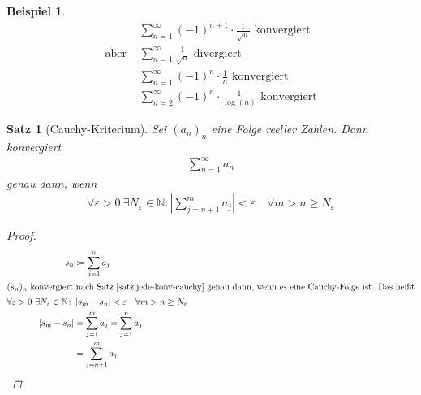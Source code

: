 \documentclass[11pt, twoside, a4paper]{article}
\theoremstyle{plain}
\newtheorem{satz}[blockelement]{Satz}
\newtheorem{beispiel}[blockelement]{Beispiel}
\newcommand{\pair}[1]{\left(#1\right)}
\newcommand{\abs}[1]{\left|#1\right|}
\newcommand{\definedas}[0]{\coloneqq}
\newcommand{\N}{\mathbb{N}}
\begin{document}
    \begin{beispiel}
        \begin{align*}
            &\sum_{n=1}^{\infty} \pair{-1}^{n+1} \cdot \frac{1}{\sqrt{n}}\text{ konvergiert}\\
            \text{aber } &\sum_{n=1}^{\infty} \frac{1}{\sqrt {n}} \text{ divergiert}\\
            &\sum_{n=1}^{\infty} (-1)^{n} \cdot \frac{1}{n}\text{ konvergiert}\\
            &\sum_{n=2}^{\infty} (-1)^n \cdot \frac{1}{\log\pair{n}}\text{ konvergiert}
        \end{align*}
    \end{beispiel}

    \begin{satz}[Cauchy-Kriterium] %
        \label{satz:cauchy-kriterium}
        Sei $(a_n)_n$ eine Folge reeller Zahlen. Dann konvergiert
        \begin{align*}
            \sum_{n=1}^{\infty} a_n
        \end{align*}
        genau dann, wenn
        \begin{align*}
            \forall \varepsilon > 0~\exists N_{\varepsilon}\in\N\colon \abs{\sum_{j=n+1}^{m} a_j} <\varepsilon\quad\forall m>n\geq N_{\varepsilon}
        \end{align*}
        \begin{proof}
            \begin{align*}
                s_n &\definedas \sum_{j=1}^{n} a_j\\
                \intertext{$(s_n)_n$ konvergiert nach Satz~\ref{satz:jede-konv-cauchy} genau dann, wenn es eine Cauchy-Folge ist. Das heißt}
                \forall\varepsilon > 0~\exists N_{\varepsilon}\in\N\colon &\abs{s_{m} - s_{n}} < \varepsilon\quad\forall m> n \geq N_{\varepsilon}\\
                \abs{s_m - s_n} &= \sum_{j=1}^{m} a_j = \sum_{j=1}^{n} a_j\\
                &= \sum_{j=n+1}^{m} a_j\qedhere
            \end{align*}
        \end{proof}
    \end{satz}
\end{document}
